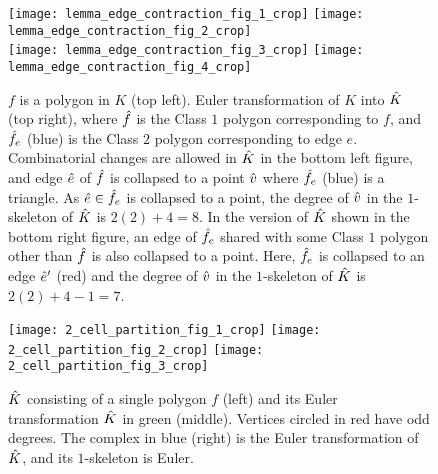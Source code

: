 \begin{figure}[htp!] 
	\centering
	\texttt{[image: lemma\_edge\_contraction\_fig\_1\_crop]}
	\hspace*{0.4in}
	\texttt{[image: lemma\_edge\_contraction\_fig\_2\_crop]}
        \vspace*{0.1in}\\
	\texttt{[image: lemma\_edge\_contraction\_fig\_3\_crop]}
	\hspace*{0.4in}
	\texttt{[image: lemma\_edge\_contraction\_fig\_4\_crop]}
	\caption{\label{fig:lemmaedgecontraction}
		$f$ is a polygon in $K$ (top left).
		Euler transformation of $K$ into $\hat{K}$ (top right), where $\hat{f}$ is the Class $1$ polygon corresponding to $f$, and $\hat{f}_e$ (blue) is the Class $2$ polygon corresponding to edge $e$.
		Combinatorial changes are allowed in $\hat{K}$ in the bottom left figure, and edge $\hat{e}$ of $\hat{f}$ is collapsed to a point $\hat{v}$ where $\hat{f}_e$ (blue) is a triangle.
		As $\hat{e} \in \hat{f}_e$ is collapsed to a point, the degree of $\hat{v}$ in the $1$-skeleton of $\hat{K}$ is $2(2) + 4 = 8$.
		In the version of $\hat{K}$ shown in the bottom right figure, an edge of $\hat{f}_e$ shared with some Class $1$ polygon other than $\hat{f}$ is also collapsed to a point.
		Here, $\hat{f}_e$ is collapsed to an edge $\hat{e}'$ (red) and the degree of $\hat{v}$ in the $1$-skeleton of $\hat{K}$ is $2(2) + 4 - 1= 7$.
	}
\end{figure}

\begin{figure}[hbp!] 
  \centering
  \texttt{[image: 2\_cell\_partition\_fig\_1\_crop]}
  \hspace*{0.25in}
  \texttt{[image: 2\_cell\_partition\_fig\_2\_crop]}
  \hspace*{0.25in}
  \texttt{[image: 2\_cell\_partition\_fig\_3\_crop]}
  \caption{\label{fig:2cellpartition}
    $\hat{K}$ consisting of a single polygon $f$ (left) and its Euler transformation $\hat{K}$ in green (middle).
    Vertices circled in red have odd degrees.
    The complex in blue (right) is the Euler transformation of $\hat{K}$, and its $1$-skeleton is Euler.}
\end{figure}


